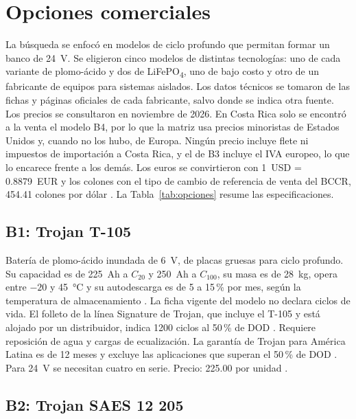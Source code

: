 \section{Opciones comerciales}\label{sec:opciones}

La búsqueda se enfocó en modelos de ciclo profundo que permitan formar un banco de \SI{24}{V}. Se eligieron cinco modelos de distintas tecnologías: uno de cada variante de plomo-ácido y dos de LiFePO\textsubscript{4}, uno de bajo costo y otro de un fabricante de equipos para sistemas aislados. Los datos técnicos se tomaron de las fichas y páginas oficiales de cada fabricante, salvo donde se indica otra fuente. Los precios se consultaron en noviembre de 2026. En Costa Rica solo se encontró a la venta el modelo B4, por lo que la matriz usa precios minoristas de Estados Unidos y, cuando no los hubo, de Europa. Ningún precio incluye flete ni impuestos de importación a Costa Rica, y el de B3 incluye el IVA europeo, lo que lo encarece frente a los demás. Los euros se convirtieron con 1~USD = 0.8879~EUR \cite{eurusd} y los colones con el tipo de cambio de referencia de venta del BCCR, 454.41 colones por dólar \cite{bccr}. La Tabla~\ref{tab:opciones} resume las especificaciones.

\subsection{B1: Trojan T-105}

Batería de plomo-ácido inundada de \SI{6}{V}, de placas gruesas para ciclo profundo. Su capacidad es de \SI{225}{Ah} a $C_{20}$ y \SI{250}{Ah} a $C_{100}$, su masa es de \SI{28}{kg}, opera entre $-20$ y \SI{45}{\celsius} y su autodescarga es de 5 a 15\,\% por mes, según la temperatura de almacenamiento \cite{trojan_t105}. La ficha vigente del modelo no declara ciclos de vida. El folleto de la línea Signature de Trojan, que incluye el T-105 y está alojado por un distribuidor, indica 1200 ciclos al 50\,\% de DOD \cite{trojan_sig}. Requiere reposición de agua y cargas de ecualización. La garantía de Trojan para América Latina es de 12 meses y excluye las aplicaciones que superan el 50\,\% de DOD \cite{trojan_latam}. Para \SI{24}{V} se necesitan cuatro en serie. Precio: \SI{225.00}{\USD} por unidad \cite{res_t105}.

\subsection{B2: Trojan SAES 12 205}

